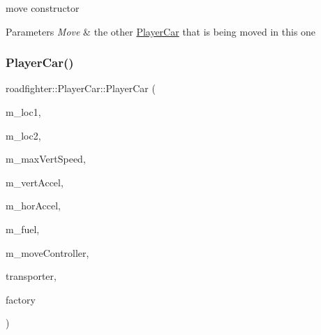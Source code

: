move constructor 
\begin{DoxyParams}{Parameters}
{\em Move} & the other \hyperlink{classroadfighter_1_1PlayerCar}{Player\+Car} that is being moved in this one \\
\hline
\end{DoxyParams}
\mbox{\label{classroadfighter_1_1PlayerCar_a50481f68beb27eeb71c3ecb7ea5bf4a1}} 
\subsubsection{\texorpdfstring{Player\+Car()}{PlayerCar()}\hspace{0.1cm}{\footnotesize\ttfamily [5/5]}}
{\footnotesize\ttfamily roadfighter\+::\+Player\+Car\+::\+Player\+Car (\begin{DoxyParamCaption}\item[{const \hyperlink{classroadfighter_1_1Location}{Location} \&}]{m\+\_\+loc1,  }\item[{const \hyperlink{classroadfighter_1_1Location}{Location} \&}]{m\+\_\+loc2,  }\item[{double}]{m\+\_\+max\+Vert\+Speed,  }\item[{double}]{m\+\_\+vert\+Accel,  }\item[{double}]{m\+\_\+hor\+Accel,  }\item[{double}]{m\+\_\+fuel,  }\item[{const std\+::shared\+\_\+ptr$<$ \hyperlink{classroadfighter_1_1InputController}{Input\+Controller} $>$ \&}]{m\+\_\+move\+Controller,  }\item[{const std\+::shared\+\_\+ptr$<$ \hyperlink{classroadfighter_1_1EntityTransporter}{Entity\+Transporter} $>$ \&}]{transporter,  }\item[{const std\+::shared\+\_\+ptr$<$ \hyperlink{classroadfighter_1_1Entity__Factory__base}{Entity\+\_\+\+Factory\+\_\+base} $>$ \&}]{factory }\end{DoxyParamCaption})}


